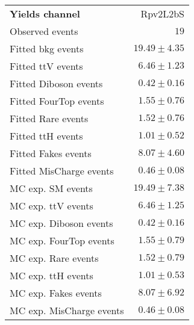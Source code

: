 

\begin{table}
\begin{center}
\setlength{\tabcolsep}{0.0pc}
{\small
\begin{tabular*}{\textwidth}{@{\extracolsep{\fill}}lr}
\noalign{\smallskip}\hline\noalign{\smallskip}
{\bfseries Yields channel}           & Rpv2L2bS              \\[-0.05cm]
\noalign{\smallskip}\hline\noalign{\smallskip}
Observed events          & $19$                    \\
\noalign{\smallskip}\hline\noalign{\smallskip}
Fitted bkg events         & $19.49 \pm 4.35$              \\
\noalign{\smallskip}\hline\noalign{\smallskip}
        Fitted ttV events         & $6.46 \pm 1.23$              \\
        Fitted Diboson events         & $0.42 \pm 0.16$              \\
        Fitted FourTop events         & $1.55 \pm 0.76$              \\
        Fitted Rare events         & $1.52 \pm 0.76$              \\
        Fitted ttH events         & $1.01 \pm 0.52$              \\
        Fitted Fakes events         & $8.07 \pm 4.60$              \\
        Fitted MisCharge events         & $0.46 \pm 0.08$              \\
 \noalign{\smallskip}\hline\noalign{\smallskip}
MC exp. SM events              & $19.49 \pm 7.38$              \\
\noalign{\smallskip}\hline\noalign{\smallskip}
        MC exp. ttV events         & $6.46 \pm 1.25$              \\
        MC exp. Diboson events         & $0.42 \pm 0.16$              \\
        MC exp. FourTop events         & $1.55 \pm 0.79$              \\
        MC exp. Rare events         & $1.52 \pm 0.79$              \\
        MC exp. ttH events         & $1.01 \pm 0.53$              \\
        MC exp. Fakes events         & $8.07 \pm 6.92$              \\
        MC exp. MisCharge events         & $0.46 \pm 0.08$              \\

\end{tabular*}}
\end{center}
\end{table}
